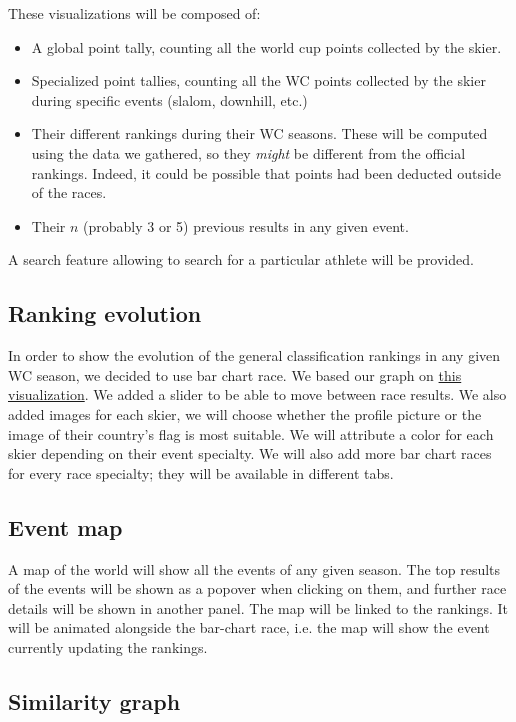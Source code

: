 \documentclass[a4paper,10pt]{article}
\begin{document}
These visualizations will be composed of:

\begin{itemize}
\item A global point tally, counting all the world cup points collected by the skier.
\item Specialized point tallies, counting all the WC points collected by the skier during specific events (slalom, downhill, etc.)
\item Their different rankings during their WC seasons.
These will be computed using the data we gathered, so they \textit{might} be different from the official rankings.
Indeed, it could be possible that points had been deducted outside of the races.
\item Their $n$ (probably 3 or 5) previous results in any given event.
\end{itemize}

A search feature allowing to search for a particular athlete will be provided.

\subsection{Ranking evolution}

In order to show the evolution of the general classification rankings in any given WC season, we decided to use bar chart race.
We based our graph on  \href{https://bl.ocks.org/jrzief/70f1f8a5d066a286da3a1e699823470f}{this visualization}. 
We added a slider to be able to move between race results.
We also added images for each skier, we will choose whether the profile picture or the image of their country's flag is most suitable.
We will attribute a color for each skier depending on their event specialty.
We will also add more bar chart races for every race specialty; they will be available in different tabs.

\subsection{Event map}

A map of the world will show all the events of any given season.
The top results of the events will be shown as a popover when clicking on them, and further race details will be shown in another panel.
The map will be linked to the rankings.
It will be animated alongside the bar-chart race, i.e. the map will show the event currently updating the rankings.

\subsection{Similarity graph}
\end{document}

